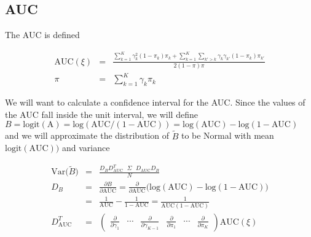 \documentclass[11pt]{article}
\begin{document}
\subsection{AUC}

The AUC is defined

\begin{eqnarray}
\mbox{AUC}(\xi) & = & \frac{
                             \sum_{k=1}^K \gamma_{k}^2 (1 - \pi_{k}) \pi_{k} + 
                             \sum_{k=1}^K \sum_{k'>k} \gamma_{k} \gamma_{k'} (1-\pi_{k}) \pi_{k'}
                         }{
                              2(1-\pi)\pi
                         }
                         \\
\pi & = & \sum_{k=1}^K \gamma_k \pi_k \label{eq:piOverall}
\end{eqnarray}

We will want to calculate a confidence interval for the AUC.  Since
the values of the AUC fall inside the unit interval, we will define
$B = \mbox{logit}(\mbox{A}) =\mbox{log}(\mbox{AUC}/(1-\mbox{AUC})) = \mbox{log}(\mbox{AUC}) -
\mbox{log}(1-\mbox{AUC})$ 
and we will approximate the distribution of
$\tilde{B}$ to be Normal with mean $\mbox{logit}(\mbox{AUC}))$ and
variance

\begin{eqnarray}
\mbox{Var}\bigl(\tilde{B}\bigr) & = & 
                               \frac{ 
                                  D_B D_{\mbox{AUC}}^T 
                                  \mbox{ }\Sigma \mbox{ }D_{\mbox{AUC}} D_B
                                }{N} \\
D_B & = & 
                            \frac{\partial B}{\partial \mbox{AUC} }
                            = \frac{\partial}{\partial \mbox{AUC} }
                            \bigl(\mbox{log}(\mbox{AUC}) - 
                            \mbox{log}(1-\mbox{AUC})
                            \bigr) \\
            & =&        \frac{1}{\mbox{AUC}}-\frac{1}{1-
                            \mbox{AUC}} = \frac{1}{\mbox{AUC}(1-\mbox{AUC})}
                             \\
%
D_{\mbox{AUC}}^T & = & 
                            \left( 
                              \begin{array}{cccccc}
                                  \frac{\partial}{\partial \gamma_1 } &
                                  \cdots &
                                  \frac{\partial}{\partial
                                    \gamma_{K-1} } &
                                  \frac{\partial}{\partial \pi_1 } &
                                  \cdots &
                                  \frac{\partial}{\partial \pi_{K} }
                              \end{array}
                            \right) \mbox{AUC}(\xi)
%
\end{eqnarray}  
\end{document}
